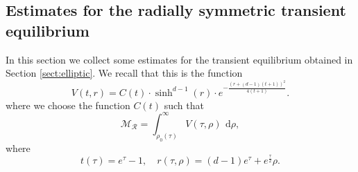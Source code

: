 \documentclass[12pt,longbibliography]{article}
\def\R{\mathbb{R}}
\def\d{\,\mathrm{d}}
\def\R{\mathbb{R}}
\def\d{\,\mathrm{d}}
\theoremstyle{definition}
\theoremstyle{remark}
\theoremstyle{example}
\begin{document}
%	

\subsection{Estimates for the radially symmetric transient equilibrium}\label{sec:UsefulBounds}
In this section we collect some estimates for the transient equilibrium obtained in Section \ref{sect:elliptic}. We recall that this is the function
\[
V(t,r) = C(t)\cdot \sinh^{d-1}(r)\cdot e^{- \frac{\left(r + (d-1)(t+1)\right)^2}{4(t+1)}}.
\]
where we choose the function $C(t)$ such that
\[
\mathcal{M}_{\mathcal{R}} = \int_{\rho_0(\tau)}^\infty V(\tau, \rho)\ \d \rho,
\]
where
\[
t(\tau)=e^\tau-1,\quad r(\tau,\rho)= (d-1)e^\tau  + e^\frac{\tau}{2}\rho.
\]
\end{document}

